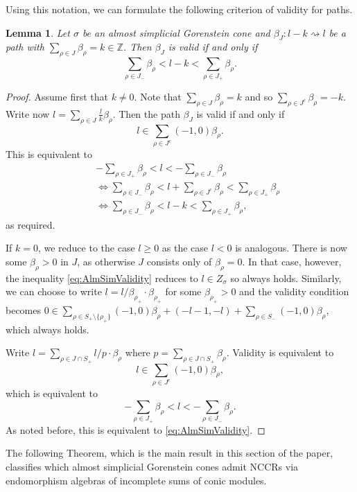 \documentclass[reqno, 12pt]{amsart}
\newtheorem{lemma}[theorem]{Lemma}
\theoremstyle{definition}
\numberwithin{equation}{section}
\newcommand{\Z}{\mathbb{Z}}
\begin{document}
Using this notation, we can formulate the following criterion of validity for paths.
\begin{lemma}
    \label{Lem:AlmSimValidity}
    Let $\sigma$ be an almost simplicial Gorenstein cone and $\beta_J:l-k\rightsquigarrow l$ be a path with $\sum_{\rho\in J}\beta_\rho=k\in \Z$. Then $\beta_J$ is valid if and only if \begin{equation}
    \label{eq:AlmSimValidity}
    \sum_{\rho\in J_-}\beta_\rho<l-k<\sum_{\rho\in J_+}\beta_\rho.
    \end{equation}
\end{lemma}
\begin{proof}
Assume first that $k\neq 0$. Note that $\sum_{\rho\in J}\beta_\rho=k$ and so $\sum_{\rho\in J^c}\beta_\rho=-k$. Write now $l=\sum_{\rho\in J}\frac{l}{k}\beta_\rho$. Then the path $\beta_J$ is valid if and only if
    \[
    l\in \sum_{\rho\in J^c}(-1,0)\beta_\rho.
    \]
    This is equivalent to \begin{eqnarray*}
        && -\sum_{\rho\in J_+}\beta_\rho<l<-\sum_{\rho\in J_-}\beta_\rho\\
        &&\Leftrightarrow \sum_{\rho\in J_-}\beta_\rho<l+\sum_{\rho\in J^c}\beta_\rho<\sum_{\rho\in J_+}\beta_\rho\\
        && \Leftrightarrow \sum_{\rho\in J_-}\beta_\rho<l-k<\sum_{\rho\in J_+}\beta_\rho,
    \end{eqnarray*}
    as required.

If $k=0$, we reduce to the case $l\ge 0$ as the case $l<0$ is analogous. There is now some $\beta_\rho>0$ in $J$, as otherwise $J$ consists only of $\beta_\rho=0$. In that case, however, the inequality \eqref{eq:AlmSimValidity} reduces to $l\in Z_\sigma$ so always holds. Similarly, we can choose to write $l= l/\beta_{\rho_+}\cdot \beta_{\rho_+}$ for some $\beta_{\rho_+}>0$ and the validity condition becomes $0\in \sum_{\rho\in S_+\setminus\{\rho_+\}}(-1,0)\beta_\rho+(-l-1,-l)+\sum_{\rho\in S_-}(-1,0)\beta_\rho$, which always holds.

Write $l=\sum_{\rho\in J\cap S_+}l/p \cdot \beta_\rho$ where $p=\sum_{\rho\in J\cap S_+}\beta_\rho$. Validity is equivalent to \[
l\in \sum_{\rho\in J^c}(-1,0)\beta_\rho,
\]
which is equivalent to \[
-\sum_{\rho\in J_+}\beta_\rho <l<-\sum_{\rho\in J_-}\beta_\rho.
\]
As noted before, this is equivalent to \eqref{eq:AlmSimValidity}.
\end{proof}


The following Theorem, which is the main result in this section of the paper, classifies which almost simplicial Gorenstein cones admit NCCRs via endomorphism algebras of incomplete sums of conic modules.
\end{document}
